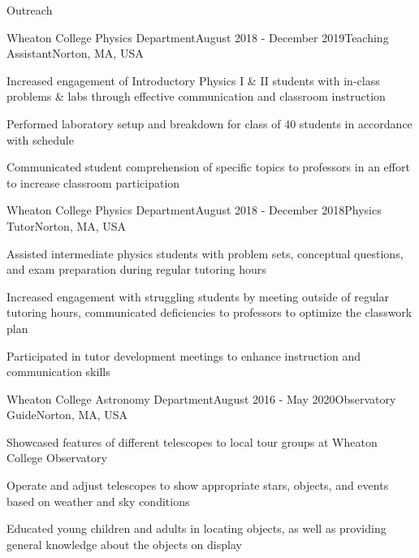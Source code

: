 \documentclass{resume} %
\begin{document}
\newpage
\begin{rSection}{Outreach}

\begin{rSubsection}{Wheaton College Physics Department}{August 2018 - December 2019}{Teaching Assistant}{Norton, MA, USA}
\item Increased engagement of Introductory Physics I \& II students with in-class problems \& labs through effective communication and classroom instruction
\item Performed laboratory setup and breakdown for class of 40 students in accordance with schedule
\item Communicated student comprehension of specific topics to professors in an effort to increase classroom participation

\end{rSubsection}

\begin{rSubsection}{Wheaton College Physics Department}{August 2018 - December 2018}{Physics Tutor}{Norton, MA, USA}
\item Assisted intermediate physics students with problem sets, conceptual questions, and exam preparation during regular tutoring hours
\item Increased engagement with struggling students by meeting outside of regular tutoring hours, communicated deficiencies to professors to optimize the classwork plan
\item Participated in tutor development meetings to enhance instruction and communication skills


\end{rSubsection}

\begin{rSubsection}{Wheaton College Astronomy Department}{August 2016 - May 2020}{Observatory Guide}{Norton, MA, USA}
\item Showcased features of different telescopes to local tour groups at Wheaton College Observatory
\item Operate and adjust telescopes to show appropriate stars, objects, and events based on weather and sky conditions
\item Educated young children and adults in locating objects, as well as providing general knowledge about the objects on display

\end{rSubsection}

\end{rSection}
\end{document}
